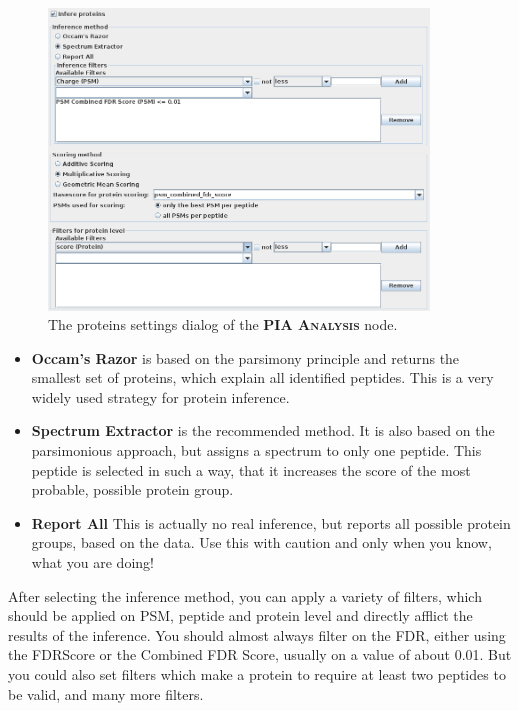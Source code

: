 \documentclass[a4paper,11pt,twoside]{article}
\newcommand{\knimenode}[1]{{\scshape\bfseries #1}}
\begin{document}
\begin{figure}[ht!]
	\centering
	\includegraphics[width=0.9\textwidth]{graphics/pia_settings_proteins}
	\caption{The proteins settings dialog of the \knimenode{PIA Analysis} node.}
	\label{pia_settings_proteins}
\end{figure}

\begin{itemize}
	\item \textbf{Occam's Razor} is based on the parsimony principle and
	returns the smallest set of proteins, which explain all identified
	peptides. This is a very widely used strategy for protein inference.

	\item \textbf{Spectrum Extractor} is the recommended method. It is also
	based on the parsimonious approach, but assigns a spectrum to only one
	peptide. This peptide is selected in such a way, that it increases the
	score of the most probable, possible protein group.

	\item \textbf{Report All} This is actually no real inference, but reports
	all possible protein groups, based on the data. Use this with caution and
	only when you know, what you are doing!
\end{itemize}

After selecting the inference method, you can apply a variety of filters, which
should be applied on PSM, peptide and protein level and directly afflict the
results of the inference. You should almost always filter on the FDR, either
using the FDRScore or the Combined FDR Score, usually on a value of about 0.01.
But you could also set filters which make a protein to require at least two
peptides to be valid, and many more filters.
\end{document}
